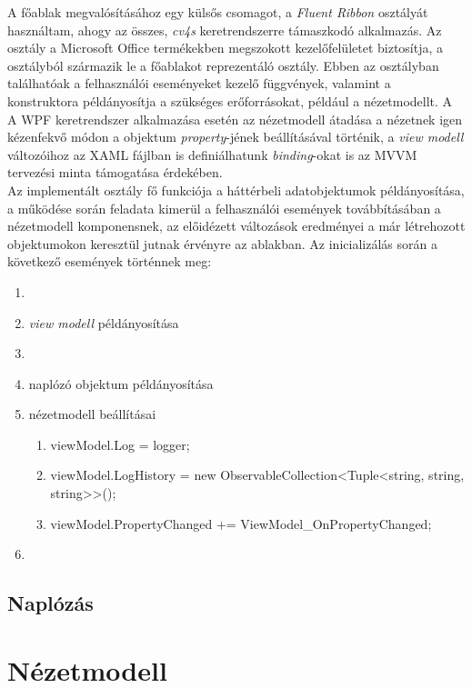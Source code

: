 A főablak megvalósításához egy külsős csomagot, a \emph{Fluent Ribbon}  osztályát használtam, ahogy az összes, \emph{cv4s} keretrendszerre támaszkodó alkalmazás. Az osztály a Microsoft Office termékekben megszokott kezelőfelületet biztosítja, a  osztályból származik le a főablakot reprezentáló osztály. Ebben az osztályban találhatóak a felhasználói eseményeket kezelő függvények, valamint a konstruktora példányosítja a szükséges erőforrásokat, például a nézetmodellt. A A WPF keretrendszer alkalmazása esetén az nézetmodell átadása a nézetnek igen kézenfekvő módon a  objektum  \emph{property}-jének beállításával történik, a \emph{view modell} változóihoz az XAML fájlban is definiálhatunk \emph{binding}-okat is az MVVM tervezési minta támogatása érdekében.\\
Az implementált osztály fő funkciója a háttérbeli adatobjektumok példányosítása, a működése során feladata kimerül a felhasználói események továbbításában a nézetmodell komponensnek, az előidézett változások eredményei a már létrehozott  objektumokon keresztül jutnak érvényre az ablakban. Az inicializálás során a következő események történnek meg:
\begin{enumerate}
\item {}
\item \emph{view modell} példányosítása
\item {}
\item naplózó objektum példányosítása
\item nézetmodell beállításai
    \begin{enumerate}
   	\item viewModel.Log = logger;
    \item viewModel.LogHistory = new ObservableCollection<Tuple<string, string, string>>();
    \item viewModel.PropertyChanged += ViewModel\_OnPropertyChanged;
    \end{enumerate}
\item {}
\end{enumerate}

\subsection{Naplózás} 

\section{Nézetmodell}

